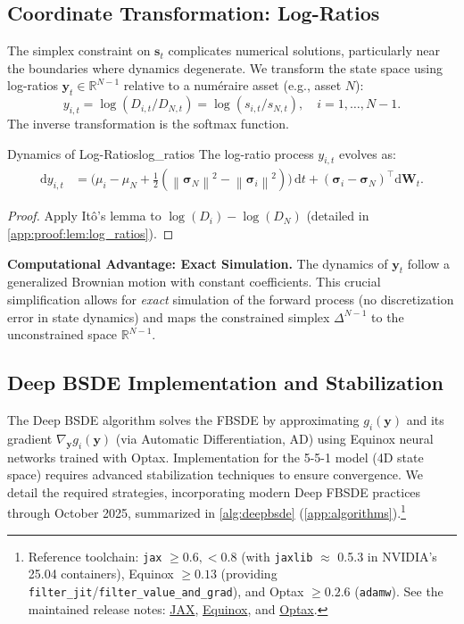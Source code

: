 \documentclass[11pt,letterpaper,oneside]{article}
\numberwithin{equation}{section}
\newcommand{\R}{\mathbb{R}}
\newcommand{\1}{\mathbf{1}}
\newcommand{\diff}{\mathrm{d}}
\newcommand{\norm}[1]{\left\lVert #1\right\rVert}
\begin{document}
\subsection{Coordinate Transformation: Log-Ratios}\label{sec:computation:log_ratios}
The simplex constraint on $\bm{s}_t$ complicates numerical solutions, particularly near the boundaries where dynamics degenerate. We transform the state space using log-ratios $\bm{y}_t \in \R^{N-1}$ relative to a num\'{e}raire asset (e.g., asset $N$):
\[
 y_{i,t} = \log(D_{i,t}/D_{N,t}) = \log(s_{i,t}/s_{N,t}), \quad i=1,\dots,N-1.
\]
The inverse transformation is the softmax function.

\begin{lemma}{Dynamics of Log-Ratios}{log_ratios}
The log-ratio process $y_{i,t}$ evolves as:
\begin{align}\label{eq:log_ratio_dynamics}
\diff y_{i,t} &= \Big(\mu_i - \mu_N + \tfrac{1}{2}(\norm{\bm{\sigma}_N}^2 - \norm{\bm{\sigma}_i}^2)\Big)\,\diff t + (\bm{\sigma}_i - \bm{\sigma}_N)^{\top}\diff\bm{W}_t.
\end{align}
\end{lemma}
\begin{proof}
Apply It\^o's lemma to $\log(D_i) - \log(D_N)$ (detailed in \cref{app:proof:lem:log_ratios}).
\end{proof}

\begin{tcolorbox}[mathstyle]
  	\textbf{Computational Advantage: Exact Simulation.} The dynamics of $\bm{y}_t$ follow a generalized Brownian motion with constant coefficients. This crucial simplification allows for \emph{exact} simulation of the forward process (no discretization error in state dynamics) and maps the constrained simplex $\Delta^{N-1}$ to the unconstrained space $\mathbb{R}^{N-1}$.
\end{tcolorbox}

\subsection{Deep BSDE Implementation and Stabilization}\label{sec:computation:stabilization}

The Deep BSDE algorithm solves the FBSDE by approximating $g_i(\bm{y})$ and its gradient $\nabla_{\bm{y}} g_i(\bm{y})$ (via Automatic Differentiation, AD) using Equinox neural networks trained with Optax. Implementation for the 5-5-1 model (4D state space) requires advanced stabilization techniques to ensure convergence. We detail the required strategies, incorporating modern Deep FBSDE practices through October 2025, summarized in \cref{alg:deepbsde} (\cref{app:algorithms}).\footnote{Reference toolchain: \texttt{jax} $\geq 0.6,<0.8$ (with \texttt{jaxlib} $\approx$ 0.5.3 in NVIDIA's 25.04 containers), Equinox $\geq 0.13$ (providing \texttt{filter\_jit}/\texttt{filter\_value\_and\_grad}), and Optax $\geq 0.2.6$ (\texttt{adamw}). See the maintained release notes: \href{https://docs.jax.dev/en/latest/changelog.html}{JAX}, \href{https://pypi.org/project/equinox/}{Equinox}, and \href{https://github.com/google-deepmind/optax/releases}{Optax}.}
\end{document}
